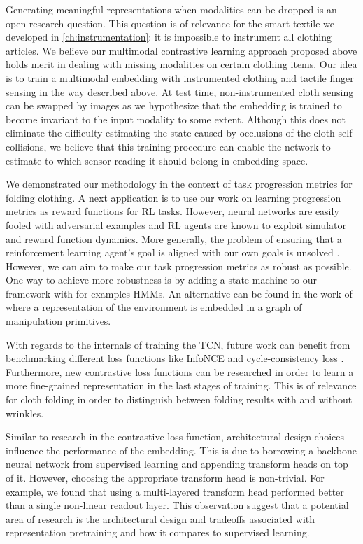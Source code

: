 \documentclass[\home/main.tex]{subfiles}
\begin{document}
Generating meaningful representations when modalities can be dropped is an open research question. This question is of relevance for the smart textile we developed in \cref{ch:instrumentation}: it is impossible to instrument all clothing articles. We believe our multimodal contrastive learning approach proposed above holds merit in dealing with missing modalities on certain clothing items. Our idea is to train a multimodal embedding with instrumented clothing and tactile finger sensing in the way described above. At test time, non-instrumented cloth sensing can be swapped by images as we hypothesize that the embedding is trained to become invariant to the input modality to some extent. Although this does not eliminate the difficulty estimating the state caused by occlusions of the cloth self-collisions, we believe that this training procedure can enable the network to estimate to which sensor reading it should belong in embedding space.

We demonstrated our methodology in the context of task progression metrics for folding clothing. A next application is to use our work on learning progression metrics as reward functions for RL tasks. However, neural networks are easily fooled with adversarial examples \autocite{nguyen2015deep} and RL agents are known to exploit simulator and reward function dynamics. More generally, the problem of ensuring that a reinforcement learning agent's goal is aligned with our own goals is unsolved \autocite{Sutton2018}. However, we can aim to make our task progression metrics as robust as possible. One way to achieve more robustness is by adding a state machine to our framework with for examples \glspl{HMM}. An alternative can be found in the work of \textcite{borràs2020encoding} where a representation of the environment is embedded in a graph of manipulation primitives.

With regards to the internals of training the \gls{TCN}, future work can benefit from benchmarking different loss functions like InfoNCE \autocite{oord2018representation} and cycle-consistency loss \autocite{Dwibedi2019cycle}. Furthermore, new contrastive loss functions can be researched in order to learn a more fine-grained representation in the last stages of training. This is of relevance for cloth folding in order to distinguish between folding results with and without wrinkles.

Similar to research in the contrastive loss function, architectural design choices influence the performance of the embedding. This is due to borrowing a backbone neural network from supervised learning and appending transform heads on top of it. However, choosing the appropriate transform head is non-trivial. For example, we found that using a multi-layered transform head performed better than a single non-linear readout layer. This observation suggest that a potential area of research is the architectural design and tradeoffs associated with representation pretraining and how it compares to supervised learning.
\end{document}
